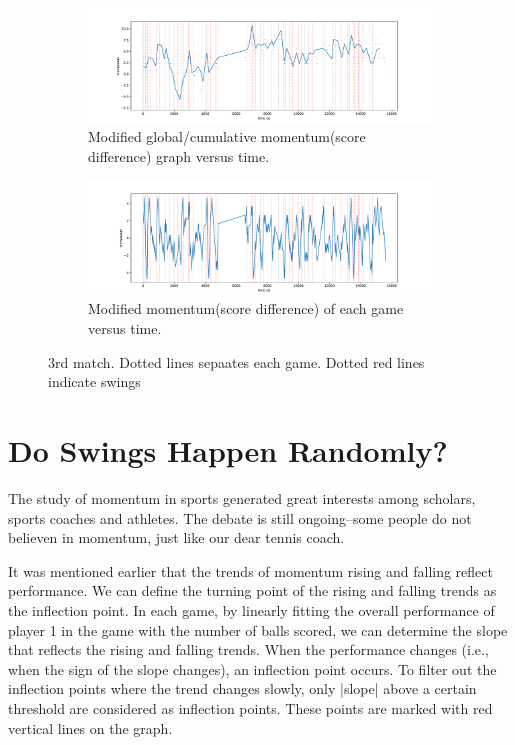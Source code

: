\documentclass[11pt,a4paper]{article}
\begin{document}
	\begin{figure}[H]
		\centering
		
		\begin{subfigure}[b]{\textwidth}
			\includegraphics[width=1\linewidth]{pics/fig4_3}
			\caption{Modified global/cumulative momentum(score difference) graph versus time.}
			\label{fig:topfig4_3}
		\end{subfigure}
		
		\vspace{1cm}
		
		\begin{subfigure}[b]{1.0\textwidth}
			\includegraphics[width=1\linewidth]{pics/fig5_3}
			\caption{Modified momentum(score difference) of each game versus time.}
			\label{fig:bottomfig5_3}
		\end{subfigure}
		
		\caption{3rd match. Dotted lines sepaates each game. Dotted red lines indicate swings}
		\label{fig:both_figures3}
	\end{figure}
	
	\section{Do Swings Happen Randomly?}
	The study of momentum in sports generated great interests among scholars, sports coaches and athletes. The debate is still ongoing--some people do not believen in momentum\cite{Hale_2021}, just like our dear tennis coach.
	
	It was mentioned earlier that the trends of momentum rising and falling reflect performance. We can define the turning point of the rising and falling trends as the inflection point. In each game, by linearly fitting the overall performance of player 1 in the game with the number of balls scored, we can determine the slope that reflects the rising and falling trends. When the performance changes (i.e., when the sign of the slope changes), an inflection point occurs. To filter out the inflection points where the trend changes slowly, only |slope| above a certain threshold are considered as inflection points. These points are marked with red vertical lines on the graph.
	
\end{document}
